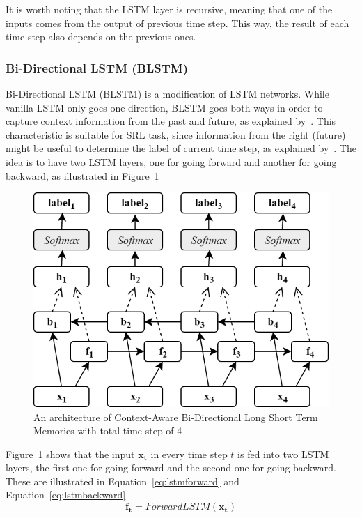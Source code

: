 It is worth noting that the LSTM layer is recursive, meaning that one of the inputs comes from the output of previous time step. This way, the result of each time step also depends on the previous ones.


\subsubsection{Bi-Directional LSTM (BLSTM)}
\label{sec:blstm}
Bi-Directional LSTM (BLSTM) is a modification of LSTM networks. While vanilla LSTM only goes one direction, BLSTM goes both ways in order to capture context information from the past and future, as explained by~\cite{zhou2015end}. This characteristic is suitable for SRL task, since information from the right (future) might be useful to determine the label of current time step, as explained by~\cite{zhou2015end}. The idea is to have two LSTM layers, one for going forward and another for going backward, as illustrated in Figure~\ref{fig:bilstm}

\begin{figure}
	\centering
	\includegraphics[width=0.75\linewidth]{images/blstm}
	\caption{An architecture of Context-Aware Bi-Directional Long Short Term Memories with total time step of 4}
	\label{fig:bilstm}
\end{figure}

Figure~\ref{fig:bilstm} shows that the input $\mathbf{x_{t}}$ in every time step $t$ is fed into two LSTM layers, the first one for going forward and the second one for going backward. These are illustrated in Equation~\ref{eq:lstmforward} and Equation~\ref{eq:lstmbackward}
\begin{equation}
\label{eq:lstmforward}
\mathbf{f_{t}} = ForwardLSTM(\mathbf{x_{t}})
\end{equation}

